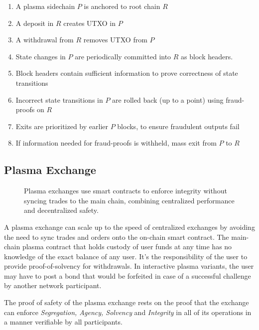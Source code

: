 \documentclass[12pt,a4paper]{article}
\begin{document}
\begin{enumerate}
    \item A plasma sidechain $P$ is anchored to root chain $R$
    \item A deposit in $R$ creates UTXO in $P$
    \item A withdrawal from $R$ removes UTXO from $P$
    \item State changes in $P$ are periodically committed into $R$ as block headers.
    \item Block headers contain sufficient information to prove correctness of state transitions
    \item Incorrect state transitions in $P$ are rolled back (up to a point) using fraud-proofs on $R$
    \item Exits are prioritized by earlier $P$ blocks, to ensure fraudulent outputs fail
    \item If information needed for fraud-proofs is withheld, mass exit from $P$ to $R$
\end{enumerate}

\subsection{Plasma Exchange}
\begin{figure}[ht]
\begin{center}

\end{center}
\caption{Plasma exchanges use smart contracts to enforce integrity without syncing trades to the main chain, combining centralized performance and decentralized safety.}
\end{figure}

A plasma exchange can scale up to the speed of centralized exchanges by avoiding the need to sync trades and orders onto the on-chain smart contract. The main-chain plasma contract that holds custody of user funds at any time has no knowledge of the exact balance of any user. It’s the responsibility of the user to provide proof-of-solvency for withdrawals. In interactive plasma variants, the user may have to post a bond that would be forfeited in case of a successful challenge by another network participant.

The proof of safety of the plasma exchange rests on the proof that the exchange can enforce \emph{Segregation, Agency, Solvency} and \emph{Integrity} in all of its operations in a manner verifiable by all participants.
\end{document}
